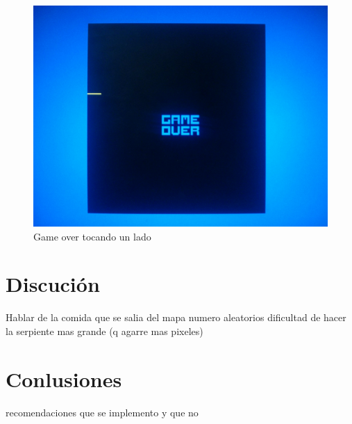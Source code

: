 \documentclass[10pt]{article}
\begin{document}
\begin{figure}[hbtp]
\centering
\includegraphics[width=1\textwidth]{game-over-side}
\caption{Game over tocando un lado}
\label{vga-over-side}
\end{figure}

\section{Discución}
Hablar de la comida que se salia del mapa
numero aleatorios
dificultad de hacer la serpiente mas grande (q agarre mas pixeles)
\section{Conlusiones}
recomendaciones
que se implemento y que no


\end{document}
